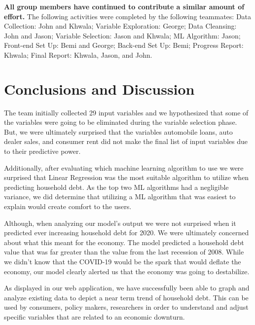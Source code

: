 \documentclass[sigconf,nonacm,11pt]{acmart}
\begin{document}
\textbf{All group members have continued to contribute a similar amount of effort.} The following activities were completed by the following teammates: Data Collection: John and Khwala; Variable Exploration: George; Data Cleansing: John and Jason; Variable Selection: Jason and Khwala; ML Algorithm: Jason; Front-end Set Up: Bemi and George; Back-end Set Up: Bemi; Progress Report: Khwala; Final Report: Khwala, Jason, and John. 



\section{Conclusions and Discussion}


The team initially collected 29 input variables and we hypothesized that some of the variables were going to be eliminated during the variable selection phase. But, we were ultimately surprised that the variables automobile loans, auto dealer sales, and consumer rent did not make the final list of input variables due to their predictive power.

Additionally, after evaluating which machine learning algorithm to use we were surprised that Linear Regression was the most suitable algorithm to utilize when predicting household debt. As the top two ML algorithms had a negligible variance, we did determine that utilizing a ML algorithm that was easiest to explain would create comfort to the users.

Although, when analyzing our model's output we were not surprised when it predicted ever increasing household debt for 2020. We were ultimately concerned about what this meant for the economy. The model predicted a household debt value that was far greater than the value from the last recession of 2008.  While we didn't know that the COVID-19 would be the spark that would deflate the economy, our model clearly alerted us that the economy was going to destabilize. 

As displayed in our web application, we have successfully been able to graph and analyze existing data to depict a near term trend of household debt. This can be used by consumers, policy makers, researchers in order to understand and adjust specific variables that are related to an economic downturn.


\end{document}
